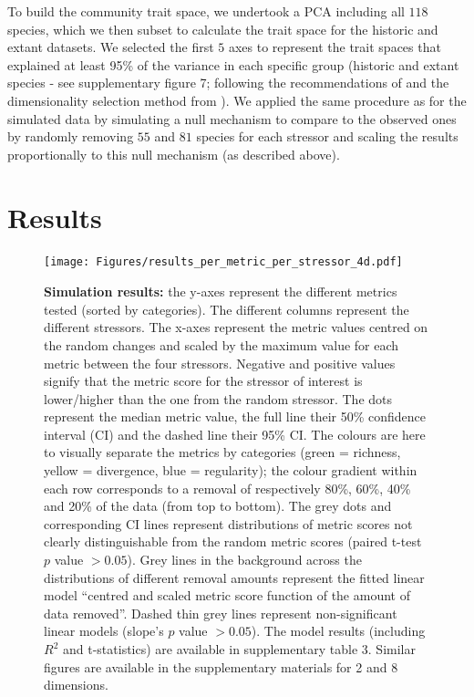 \documentclass[12pt,letterpaper]{article}
\begin{document}
To build the community trait space, we undertook a PCA including all $118$ species, which we then subset to calculate the trait space for the historic and extant datasets.
We selected the first $5$ axes to represent the trait spaces that explained at least 95\% of the variance in each specific group (historic and extant species - see supplementary figure 7; following the recommendations of \citealt{pigot2020macroevolutionary} and the dimensionality selection method from \citealt{guillerme2023innovation}).
We applied the same procedure as for the simulated data by simulating a null mechanism to compare to the observed ones by randomly removing $55$ and $81$ species for each stressor and scaling the results proportionally to this null mechanism (as described above).


\section{Results}

\begin{figure}[!htbp]
\centering
   \texttt{[image: Figures/results\_per\_metric\_per\_stressor\_4d.pdf]}
\caption{\scriptsize{\textbf{Simulation results:} the y-axes represent the different metrics tested (sorted by categories).
The different columns represent the different stressors. The x-axes represent the metric values centred on the random changes and scaled by the maximum value for each metric between the four stressors.
Negative and positive values signify that the metric score for the stressor of interest is lower/higher than the one from the random stressor.
The dots represent the median metric value, the full line their 50\% confidence interval (CI) and the dashed line their 95\% CI.
The colours are here to visually separate the metrics by categories (green = richness, yellow = divergence, blue = regularity); the colour gradient within each row corresponds to a removal of respectively 80\%, 60\%, 40\% and 20\% of the data (from top to bottom).
The grey dots and corresponding CI lines represent distributions of metric scores not clearly distinguishable from the random metric scores (paired t-test $p$ value $> 0.05$).
Grey lines in the background across the distributions of different removal amounts represent the fitted linear model ``centred and scaled metric score function of the amount of data removed''.
Dashed thin grey lines represent non-significant linear models (slope's $p$ value $> 0.05$).
The model results (including $R^{2}$ and t-statistics) are available in supplementary table 3.
Similar figures are available in the supplementary materials for 2 and 8 dimensions.}}
\label{Fig:simulation_results}
\end{figure}
\bigskip
\end{document}
